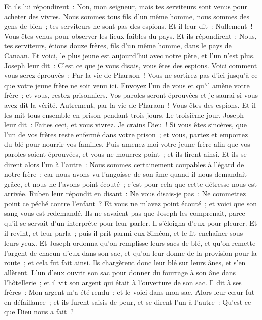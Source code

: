 \begin{multicols}{2}
Et ils lui répondirent~: Non, mon seigneur, mais tes serviteurs sont venus pour acheter des vivres.
Nous sommes tous fils d'un même homme, nous sommes des gens de bien~; tes serviteurs ne sont pas des espions.
Et il leur dit~: Nullement~! Vous êtes venus pour observer les lieux faibles du pays.
Et ils répondirent~: Nous, tes serviteurs, étions douze frères, fils d'un même homme, dans le pays de Canaan. Et voici, le plus jeune est aujourd'hui avec notre père, et l'un n'est plus.
Joseph leur dit~: C'est ce que je vous disais, vous êtes des espions.
Voici comment vous serez éprouvés~: Par la vie de Pharaon~! Vous ne sortirez pas d'ici jusqu'à ce que votre jeune frère ne soit venu ici.
Envoyez l'un de vous et qu'il amène votre frère~; et vous, restez prisonniers. Vos paroles seront éprouvées et je saurai si vous avez dit la vérité. Autrement, par la vie de Pharaon~! Vous êtes des espions.
Et il les mit tous ensemble en prison pendant trois jours.
Le troisième jour, Joseph leur dit~: Faites ceci, et vous vivrez. Je crains Dieu~!
Si vous êtes sincères, que l'un de vos frères reste enfermé dans votre prison~; et vous, partez et emportez du blé pour nourrir vos familles.
Puis amenez-moi votre jeune frère afin que vos paroles soient éprouvées, et vous ne mourrez point~; et ils firent ainsi.
Et ils se dirent alors l'un à l'autre~: Nous sommes certainement coupables à l'égard de notre frère~; car nous avons vu l'angoisse de son âme quand il nous demandait grâce, et nous ne l'avons point écouté~; c'est pour cela que cette détresse nous est arrivée.
Ruben leur répondit en disant~: Ne vous disais-je pas~: Ne commettez point ce péché contre l'enfant~? Et vous ne m'avez point écouté~; et voici que son sang vous est redemandé.
Ils ne savaient pas que Joseph les comprenait, parce qu'il se servait d'un interprète pour leur parler.
Il s'éloigna d'eux pour pleurer. Et il revint, et leur parla~; puis il prit parmi eux Siméon, et le fit enchaîner sous leurs yeux.
Et Joseph ordonna qu'on remplisse leurs sacs de blé, et qu'on remette l'argent de chacun d'eux dans son sac, et qu'on leur donne de la provision pour la route~; et cela fut fait ainsi.
Ils chargèrent donc leur blé sur leurs ânes, et s'en allèrent.
L'un d'eux ouvrit son sac pour donner du fourrage à son âne dans l'hôtellerie~; et il vit son argent qui était à l'ouverture de son sac.
Il dit à ses frères~: Mon argent m'a été rendu~; et le voici dans mon sac. Alors leur cœur fut en défaillance~; et ils furent saisis de peur, et se dirent l'un à l'autre~: Qu'est-ce que Dieu nous a fait~?

\end{multicols}
